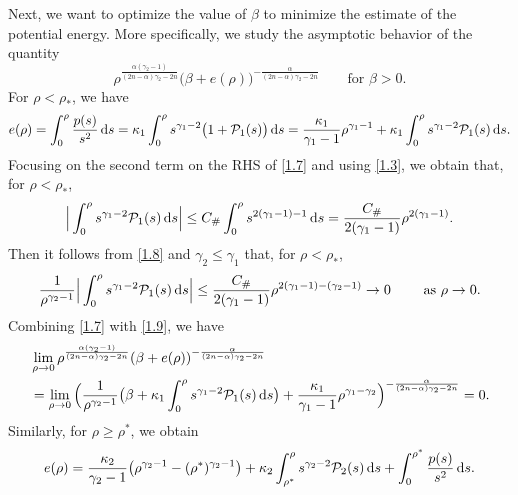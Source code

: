 \documentclass[reqno,11pt]{amsart}
\numberwithin{equation}{section}
\theoremstyle{definition}
\def\dd{{\, \rm d}}
\begin{document}
Next, we want to optimize the value of $\beta$ to minimize the estimate of the potential energy. 
More specifically, we study the asymptotic behavior of the quantity
    \[
    \rho^{\frac{\alpha(\gamma_2-1)}{(2n-\alpha)\gamma_2 - 2n}}
    \big(\beta + e(\rho)\big)^{-\frac{\alpha}{(2n-\alpha)\gamma_2 - 2n}}   \qquad\mbox{for $\beta >0$}. 
    \]
For $\rho < \rho_*$, we have 
\begin{align}\label{1.7}
     e(\rho) = \int^\rho_0 \frac{p(s)}{s^2} \dd s 
  = \kappa_1 \int^\rho_0 s^{\gamma_1 - 2}\big(1 + \mathcal{P}_1(s)\big) \dd s = \frac{\kappa_1}{\gamma_1 - 1} \rho^{\gamma_1 - 1} + \kappa_1 \int^\rho_0 s^{\gamma_1 - 2} \mathcal{P}_1(s) \dd s.
    \end{align}
Focusing on the second term on the RHS of \eqref{1.7} and using \eqref{1.3}, we obtain that, for $\rho < \rho_*$,
    \begin{align}\label{1.8}
 \Big| \int^\rho_0 s^{\gamma_1 - 2} \mathcal{P}_1(s) \dd s \Big| 
\leq C_\# \int^\rho_0 s^{2(\gamma_1 - 1) - 1} \dd s = \frac{C_\#}{2(\gamma_1 - 1)}\rho^{2(\gamma_1 - 1)}.
    \end{align}
Then it follows from  \eqref{1.8} and
$\gamma_2 \leq \gamma_1$ that, for $\rho < \rho_*$,
    \begin{align}\label{1.9}
 \frac{1}{\rho^{\gamma_2 - 1}} \Big| \int^\rho_0 s^{\gamma_1 - 2} \mathcal{P}_1(s) \dd s \Big| 
\leq \frac{C_\#}{2(\gamma_1 - 1)}\rho^{2(\gamma_1 - 1) - (\gamma_2 - 1)} 
 \rightarrow 0 \qquad \text{ as $\rho \to 0$}.
    \end{align}
Combining \eqref{1.7} with \eqref{1.9}, we have
\begin{align}\label{1.10}
        \begin{split}
& \lim_{\rho \to 0} \rho^{\frac{\alpha(\gamma_2-1)}{(2n-\alpha)\gamma_2 - 2n}}(\beta + e(\rho))^{-\frac{\alpha}{(2n-\alpha)\gamma_2 - 2n}} \\
  & = \lim_{\rho \to 0} \Big(\frac{1}{\rho^{\gamma_2 - 1}} 
\big(\beta + \kappa_1 \int^\rho_0 s^{\gamma_1 - 2} \mathcal{P}_1(s) \dd s \big) 
 + \frac{\kappa_1}{\gamma_1 - 1} \rho^{\gamma_1 - \gamma_2}
\Big)^{-\frac{\alpha}{(2n-\alpha)\gamma_2 - 2n}} = 0.
 \end{split}
\end{align}
Similarly, for $\rho \geq \rho^*$, we obtain
    \begin{align}\label{1.11}
  e(\rho) = \frac{\kappa_2}{\gamma_2 - 1} \big(\rho^{\gamma_2 - 1} - (\rho^*)^{\gamma_2 - 1}\big) 
 + \kappa_2 \int^\rho_{\rho^*} s^{\gamma_2 - 2} \mathcal{P}_2(s) \dd s 
+ \int^{\rho^*}_0 \frac{p(s)}{s^2} \dd s.
    \end{align}
\end{document}
